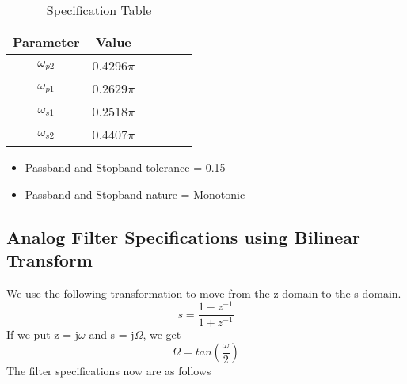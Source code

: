 \documentclass[12pt]{article}
\begin{document}
\begin{table}[!hbt]
		\begin{center}
		\caption{Specification Table}
		\begin{tabular}{|c|c|c|c|c|c|}
			\hline
			  Parameter & Value \\
			\hline
			 $\omega_{p2}$& 0.4296$\pi$ \\
			\hline
			 $\omega_{p1}$ &  0.2629$\pi$\\
			\hline
			 $\omega_{s1}$ & 0.2518$\pi$\\
			\hline
		     $\omega_{s2}$ & 0.4407$\pi$\\
			\hline
		
		\end{tabular}
		\end{center}
\end{table}


\begin{itemize}
    \item Passband and Stopband tolerance = 0.15
    \item Passband and Stopband nature = Monotonic
\end{itemize}






\subsection{\textbf{Analog Filter Specifications using Bilinear Transform}}
We use the following transformation to move from the z domain to the s
domain.
\begin{equation*}
    s = \frac{1-z^{-1}}{1+z^{-1}}
    
\end{equation*}
If we put z = j$\omega$ and s = j$\Omega$, we get
\begin{equation*}
    \Omega = tan(\frac{\omega}{2})
\end{equation*}
\newpage
The filter specifications now are as follows
\end{document}
